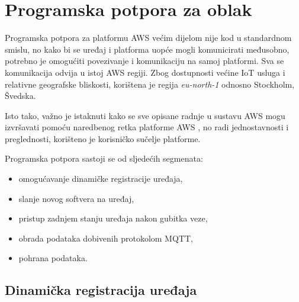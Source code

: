 \section{Programska potpora za oblak}

Programska potpora za platformu AWS većim dijelom nije kod u standardnom smislu, no kako bi se uređaj i platforma uopće mogli komunicirati međusobno, potrebno je omogućiti povezivanje i komunikaciju na samoj platformi. Sva se komunikacija odvija u istoj AWS regiji. Zbog dostupnosti većine IoT usluga i relativne geografske bliskosti, korištena je regija \textit{eu-north-1} odnosno Stockholm, Švedska. 

Isto tako, važno je istaknuti kako se sve opisane radnje u sustavu AWS mogu izvršavati pomoću naredbenog retka platforme AWS , no radi jednostavnosti i preglednosti, korišteno je korisničko sučelje platforme.

Programska potpora sastoji se od sljedećih segmenata:
\begin{itemize}
	\item omogućavanje dinamičke registracije uređaja,
	\item slanje novog softvera na uređaj,
	\item pristup zadnjem stanju uređaja nakon gubitka veze,
	\item obrada podataka dobivenih protokolom MQTT,
	\item pohrana podataka.
\end{itemize}

\subsection{Dinamička registracija uređaja}

